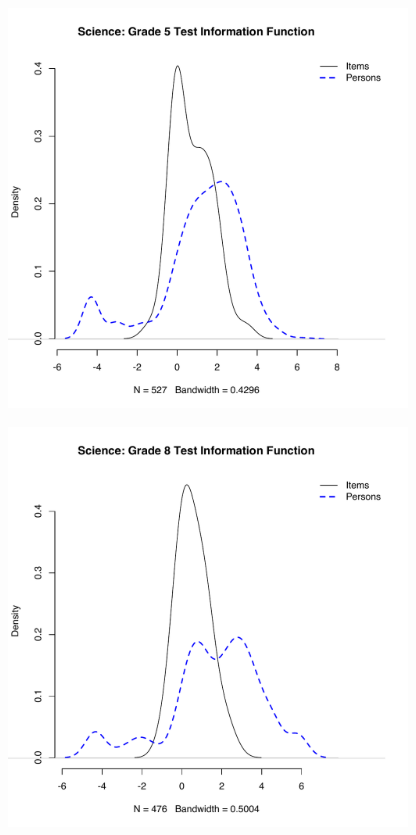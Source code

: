 \documentclass[]{article}
\begin{document}
\begin{figure}
\centering
\includegraphics[height=4.16667in]{ipdens/science5ipdens.pdf}
\caption{}
\end{figure}

\begin{figure}
\centering
\includegraphics[height=4.16667in]{ipdens/science8ipdens.pdf}
\caption{}
\end{figure}
\end{document}
